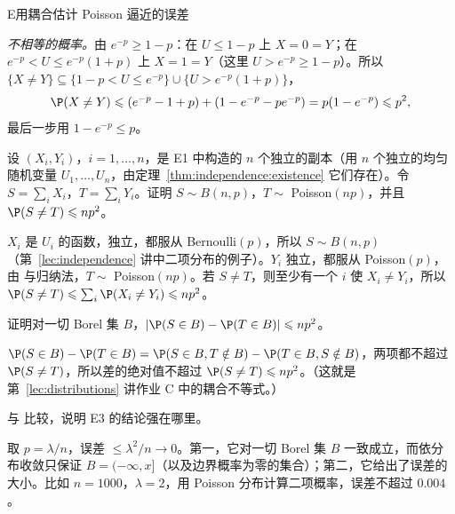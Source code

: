 \begin{probleme}{E}{用耦合估计 Poisson 逼近的误差}
\begin{questions}
\begin{solution}
\emph{不相等的概率。}由 $e^{-p}\geqslant1-p$：在 $U\leqslant1-p$ 上 $X=0=Y$；在 $e^{-p}<U\leqslant e^{-p}(1+p)$ 上 $X=1=Y$（这里 $U>e^{-p}\geqslant1-p$）。所以 $\{X\neq Y\}\subseteq\{1-p<U\leqslant e^{-p}\}\cup\{U>e^{-p}(1+p)\}$，
\[
\P(X\neq Y)\leqslant(e^{-p}-1+p)+(1-e^{-p}-pe^{-p})=p(1-e^{-p})\leqslant p^2,
\]
最后一步用 $1-e^{-p}\leqslant p$。
\end{solution}
\item 设 $(X_i,Y_i)$，$i=1,\dots,n$，是 E1 中构造的 $n$ 个独立的副本（用 $n$ 个独立的均匀随机变量 $U_1,\dots,U_n$，由定理~\ref{thm:independence:existence} 它们存在）。令 $S=\sum_iX_i$，$T=\sum_iY_i$。证明 $S\sim B(n,p)$，$T\sim$ Poisson$(np)$，并且 $\P(S\neq T)\leqslant np^2$。
\begin{solution}
$X_i$ 是 $U_i$ 的函数，独立，都服从 Bernoulli$(p)$，所以 $S\sim B(n,p)$（第~\ref{lec:independence} 讲中二项分布的例子）。$Y_i$ 独立，都服从 Poisson$(p)$，由 与归纳法，$T\sim$ Poisson$(np)$。若 $S\neq T$，则至少有一个 $i$ 使 $X_i\neq Y_i$，所以 $\P(S\neq T)\leqslant\sum_i\P(X_i\neq Y_i)\leqslant np^2$。
\end{solution}
\item 证明对一切 Borel 集 $B$，$\abs{\P(S\in B)-\P(T\in B)}\leqslant np^2$。
\begin{solution}
$\P(S\in B)-\P(T\in B)=\P(S\in B,T\notin B)-\P(T\in B,S\notin B)$，两项都不超过 $\P(S\neq T)$，所以差的绝对值不超过 $\P(S\neq T)\leqslant np^2$。（这就是第~\ref{lec:distributions} 讲作业 C 中的耦合不等式。）
\end{solution}
\item 与 比较，说明 E3 的结论强在哪里。
\begin{solution}
取 $p=\lambda/n$，误差 $\leqslant\lambda^2/n\to0$。第一，它对一切 Borel 集 $B$ 一致成立，而依分布收敛只保证 $B=(-\infty,x]$（以及边界概率为零的集合）；第二，它给出了误差的大小。比如 $n=1000$，$\lambda=2$，用 Poisson 分布计算二项概率，误差不超过 $0.004$。
\end{solution}
\end{questions}
\end{probleme}
